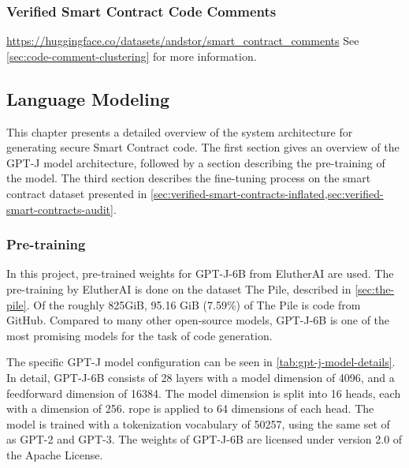 \subsubsection{Verified Smart Contract Code Comments}
\label{sec:verified-smart-contracts-comments}

\url{https://huggingface.co/datasets/andstor/smart_contract_comments}
See \cref{sec:code-comment-clustering} for more information.


\subsection{Language Modeling}
\label{sec:language-modeling}
This chapter presents a detailed overview of the system architecture for generating secure Smart Contract code. The first section gives an overview of the GPT-J model architecture, followed by a section describing the pre-training of the model. The third section describes the fine-tuning process on the smart contract dataset presented in \cref{sec:verified-smart-contracts-inflated,sec:verified-smart-contracts-audit}. 


\subsubsection{Pre-training}
\label{sec:pretraining}
In this project, pre-trained weights for GPT-J-6B from ElutherAI are used. The pre-training by ElutherAI is done on the dataset The Pile, described in \cref{sec:the-pile}. Of the roughly 825GiB, 95.16 GiB (7.59\%) of The Pile is code from GitHub. Compared to many other open-source models, GPT-J-6B is one of the most promising models for the task of code generation.

The specific GPT-J model configuration can be seen in \cref{tab:gpt-j-model-details}. In detail, GPT-J-6B consists of 28 layers with a model dimension of 4096, and a feedforward dimension of 16384. The model dimension is split into 16 heads, each with a dimension of 256. \acrfull{rope} is applied to 64 dimensions of each head. The model is trained with a tokenization vocabulary of 50257, using the same set of  as GPT-2 and GPT-3. The weights of GPT-J-6B are licensed under version 2.0 of the Apache License.



